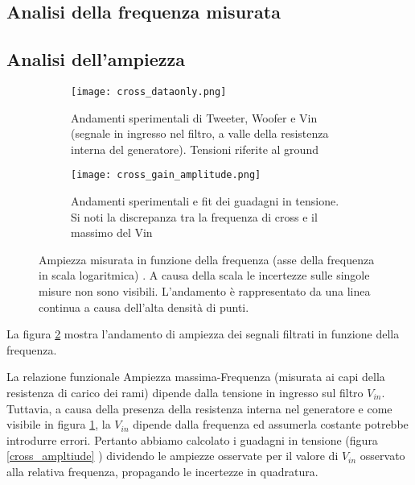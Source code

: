 \documentclass[../Relazione_circuiti]{subfiles}
\begin{document}
\subsection{Analisi della frequenza misurata}

\subsection{Analisi dell'ampiezza}

  \begin{figure}[H]
    \centering

    \begin{subfigure}{=0.5\textwidth}

      \texttt{[image: cross\_dataonly.png]}

      \caption{Andamenti sperimentali di Tweeter, Woofer e Vin (segnale in ingresso nel filtro,
        a valle della resistenza interna del generatore). Tensioni riferite al ground}
      \label{fig: amplitude_dataonly}

    \end{subfigure}

    \begin{subfigure}{=0.5\textwidth}

      \texttt{[image: cross\_gain\_amplitude.png]}

      \caption
      {Andamenti sperimentali e fit dei guadagni in tensione. Si noti la discrepanza tra la frequenza di cross e il
      massimo del Vin}

    \end{subfigure}

    \caption{Ampiezza misurata in funzione della frequenza (asse della frequenza in scala logaritmica)
      . A causa della scala le incertezze sulle singole misure non sono visibili. L'andamento è rappresentato da una
      linea continua a causa dell'alta densità di punti.}
    \label{fig: cross_amplitude}

  \end{figure}

  La figura \ref{fig: cross_amplitude} mostra l'andamento di ampiezza dei segnali filtrati in funzione della frequenza.

  La relazione funzionale Ampiezza massima-Frequenza (misurata ai capi della resistenza di carico dei rami) dipende
  dalla tensione in ingresso sul filtro $V_{in}$.
  Tuttavia, a causa della presenza della resistenza interna nel generatore e come visibile in figura
      \ref{fig: amplitude_dataonly}, la $V_{in}$
      dipende dalla frequenza ed assumerla costante potrebbe introdurre errori.
      Pertanto abbiamo calcolato i guadagni in tensione (figura \ref{cross_ampltiude}
      ) dividendo le ampiezze osservate per il valore di $V_{in}$
      osservato alla relativa frequenza, propagando le incertezze in quadratura.
\end{document}
